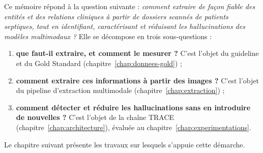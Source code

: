 Ce mémoire répond à la question suivante : \emph{comment extraire de façon fiable des entités et des relations cliniques à partir de dossiers scannés de patients septiques, tout en identifiant, caractérisant et réduisant les hallucinations des modèles multimodaux ?} Elle se décompose en trois sous-questions :
\begin{enumerate}
    \item \textbf{que faut-il extraire, et comment le mesurer ?} C'est l'objet du guideline et du Gold Standard (chapitre~\ref{chap:donnees-gold}) ;
    \item \textbf{comment extraire ces informations à partir des images ?} C'est l'objet du pipeline d'extraction multimodale (chapitre~\ref{chap:extraction}) ;
    \item \textbf{comment détecter et réduire les hallucinations sans en introduire de nouvelles ?} C'est l'objet de la chaîne TRACE (chapitre~\ref{chap:architecture}), évaluée au chapitre~\ref{chap:experimentations}.
\end{enumerate}
Le chapitre suivant présente les travaux sur lesquels s'appuie cette démarche.
